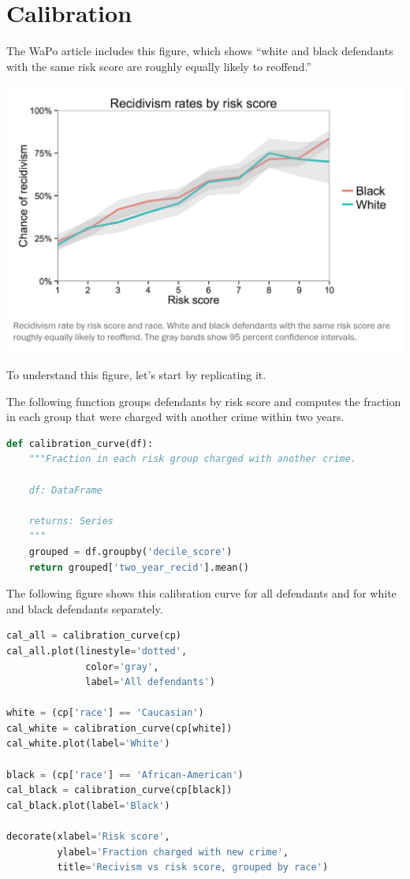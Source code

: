 \hypertarget{calibration-1}{%
\section{Calibration}\label{calibration-1}}

The WaPo article includes this figure, which shows ``white and black
defendants with the same risk score are roughly equally likely to
reoffend.''

\includegraphics{figs/calibration1.png}

To understand this figure, let's start by replicating it.

The following function groups defendants by risk score and computes the
fraction in each group that were charged with another crime within two
years.

\begin{lstlisting}[language=Python]
def calibration_curve(df):
    """Fraction in each risk group charged with another crime.
    
    df: DataFrame
    
    returns: Series
    """
    grouped = df.groupby('decile_score')
    return grouped['two_year_recid'].mean()
\end{lstlisting}

The following figure shows this calibration curve for all defendants and
for white and black defendants separately.

\begin{lstlisting}[language=Python]
cal_all = calibration_curve(cp)
cal_all.plot(linestyle='dotted', 
              color='gray',
              label='All defendants')

white = (cp['race'] == 'Caucasian')
cal_white = calibration_curve(cp[white])
cal_white.plot(label='White')

black = (cp['race'] == 'African-American')
cal_black = calibration_curve(cp[black])
cal_black.plot(label='Black')

decorate(xlabel='Risk score',
         ylabel='Fraction charged with new crime',
         title='Recivism vs risk score, grouped by race')
\end{lstlisting}

